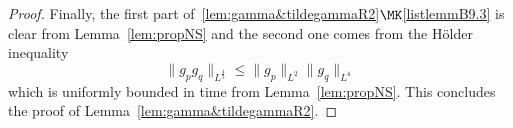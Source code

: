 \begin{proof}


Finally, the first part of~\ref{lem:gamma&tildegammaR2}$\MK$\eqref{listlemmB9.3} is clear from Lemma~\ref{lem:propNS} and the second one comes from the H\"older inequality
\[
\|g_pg_q\|_{L^{\frac43}} \le \|g_p\|_{L^2} \|g_q\|_{L^4}
\]
which is uniformly bounded in time from Lemma~\ref{lem:propNS}. This concludes the proof of Lemma~\ref{lem:gamma&tildegammaR2}.
\end{proof}


